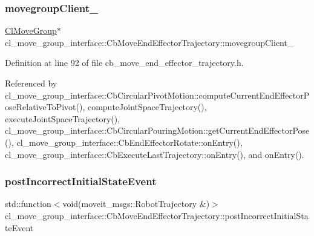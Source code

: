 \subsubsection{\texorpdfstring{movegroup\+Client\+\_\+}{movegroupClient\_}}
{\footnotesize\ttfamily \hyperlink{classcl__move__group__interface_1_1ClMoveGroup}{Cl\+Move\+Group}$\ast$ cl\+\_\+move\+\_\+group\+\_\+interface\+::\+Cb\+Move\+End\+Effector\+Trajectory\+::movegroup\+Client\+\_\+\hspace{0.3cm}{\ttfamily [protected]}}



Definition at line 92 of file cb\+\_\+move\+\_\+end\+\_\+effector\+\_\+trajectory.\+h.



Referenced by cl\+\_\+move\+\_\+group\+\_\+interface\+::\+Cb\+Circular\+Pivot\+Motion\+::compute\+Current\+End\+Effector\+Pose\+Relative\+To\+Pivot(), compute\+Joint\+Space\+Trajectory(), execute\+Joint\+Space\+Trajectory(), cl\+\_\+move\+\_\+group\+\_\+interface\+::\+Cb\+Circular\+Pouring\+Motion\+::get\+Current\+End\+Effector\+Pose(), cl\+\_\+move\+\_\+group\+\_\+interface\+::\+Cb\+End\+Effector\+Rotate\+::on\+Entry(), cl\+\_\+move\+\_\+group\+\_\+interface\+::\+Cb\+Execute\+Last\+Trajectory\+::on\+Entry(), and on\+Entry().

\mbox{\label{classcl__move__group__interface_1_1CbMoveEndEffectorTrajectory_a6180230347c922fa0d85f514ce5029df}} 
\subsubsection{\texorpdfstring{post\+Incorrect\+Initial\+State\+Event}{postIncorrectInitialStateEvent}}
{\footnotesize\ttfamily std\+::function$<$void(moveit\+\_\+msgs\+::\+Robot\+Trajectory \&)$>$ cl\+\_\+move\+\_\+group\+\_\+interface\+::\+Cb\+Move\+End\+Effector\+Trajectory\+::post\+Incorrect\+Initial\+State\+Event\hspace{0.3cm}{\ttfamily [private]}}



